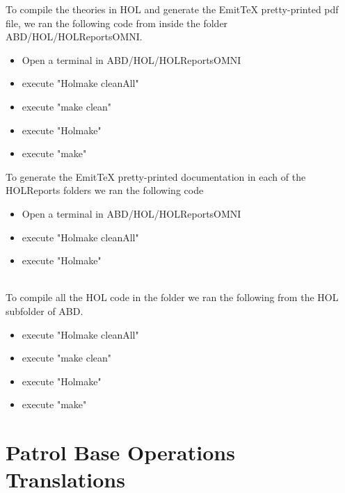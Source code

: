 To compile the theories in HOL and generate the EmitTeX pretty-printed pdf file, we ran the following code from inside the folder ABD/HOL/HOLReportsOMNI.

\begin{itemize}
\item Open a terminal in ABD/HOL/HOLReportsOMNI
\item execute "Holmake cleanAll"
\item execute "make clean"
\item execute "Holmake"
  \item execute "make"\\
  \end{itemize}

  To generate the EmitTeX pretty-printed documentation in each of the HOLReports folders we ran the following code
  \begin{itemize}
  \item Open a terminal in ABD/HOL/HOLReportsOMNI
  \item execute "Holmake cleanAll"
    \item execute "Holmake"\\\\
    \end{itemize}

    To compile all the HOL code in the folder we ran the following from the HOL subfolder of ABD.
    \begin{itemize}
    \item execute "Holmake cleanAll"
    \item execute "make clean"
    \item execute "Holmake"
      \item execute "make"\\
      \end{itemize}

\section{Patrol Base Operations Translations}
\label{sec:patr-base-oper}




